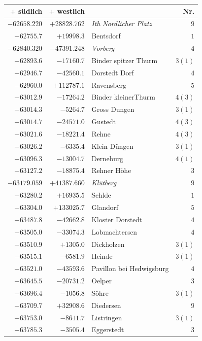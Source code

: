 \clearpage{}%
\begin{center}\begingroup\fontsize{8}{9}\selectfont
\setlength{\tabcolsep}{4pt}
\begin{tabular}{r|r|p{170pt}|r}\hline
\(+\) südlich&\(+\) westlich&&Nr.\\\hline
\(-62658.220\)&\(+28828.762\)&\textit{Ith Nordlicher Platz}&\(9\)\\
\(-62755.7\)&\(+19998.3\)&Bentsdorf&\(1\)\\
\(-62840.320\)&\(-47391.248\)&\textit{Vorberg}&\(4\)\\
\(-62893.6\)&\(-17160.7\)&Binder spitzer Thurm&\(3 (1)\)\\
\(-62946.7\)&\(-42560.1\)&Dorstedt Dorf&\(4\)\\
\(-62960.0\)&\(+112787.1\)&Ravensberg&\(5\)\\
\(-63012.9\)&\(-17264.2\)&Binder kleinerThurm&\(4 (3)\)\\
\(-63014.3\)&\(-5264.7\)&Gross Dungen&\(3 (1)\)\\
\(-63014.7\)&\(-24571.0\)&Gustedt&\(4 (3)\)\\
\(-63021.6\)&\(-18221.4\)&Rehne&\(4 (3)\)\\
\(-63026.2\)&\(-6335.4\)&Klein Düngen&\(3 (1)\)\\
\(-63096.3\)&\(-13004.7\)&Derneburg&\(4 (1)\)\\
\(-63127.2\)&\(-18875.4\)&Rehner Höhe&\(3\)\\
\(-63179.059\)&\(+41387.660\)&\textit{Klütberg}&\(9\)\\
\(-63280.2\)&\(+16935.5\)&Sehlde&\(1\)\\
\(-63304.0\)&\(+133025.7\)&Glandorf&\(5\)\\
\(-63487.8\)&\(-42662.8\)&Kloster Dorstedt&\(4\)\\
\(-63505.0\)&\(-33074.3\)&Lobmachtersen&\(4\)\\
\(-63510.9\)&\(+1305.0\)&Dickholzen&\(3 (1)\)\\
\(-63515.1\)&\(-6581.9\)&Heinde&\(3 (1)\)\\
\(-63521.0\)&\(-43593.6\)&Pavillon bei Hedwigsburg&\(4\)\\
\(-63645.5\)&\(-20731.2\)&Oelper&\(3\)\\
\(-63696.4\)&\(-1056.8\)&Söhre&\(3 (1)\)\\
\(-63709.7\)&\(+32908.6\)&Diedersen&\(9\)\\
\(-63753.0\)&\(-8611.7\)&Listringen&\(3 (1)\)\\
\(-63785.3\)&\(-3505.4\)&Eggerstedt&\(3\)\\

\end{tabular}
\end{center}
